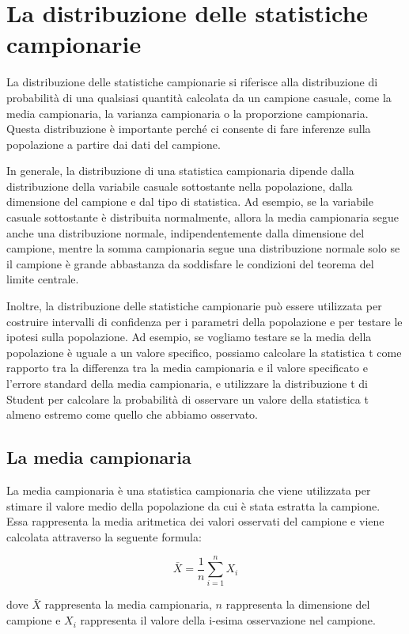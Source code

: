 \chapter{La distribuzione delle statistiche campionarie}
La distribuzione delle statistiche campionarie si riferisce alla distribuzione di probabilità di una qualsiasi quantità calcolata da un campione casuale, come la media campionaria, la varianza campionaria o la proporzione campionaria. Questa distribuzione è importante perché ci consente di fare inferenze sulla popolazione a partire dai dati del campione.

In generale, la distribuzione di una statistica campionaria dipende dalla distribuzione della variabile casuale sottostante nella popolazione, dalla dimensione del campione e dal tipo di statistica. Ad esempio, se la variabile casuale sottostante è distribuita normalmente, allora la media campionaria segue anche una distribuzione normale, indipendentemente dalla dimensione del campione, mentre la somma campionaria segue una distribuzione normale solo se il campione è grande abbastanza da soddisfare le condizioni del teorema del limite centrale.

Inoltre, la distribuzione delle statistiche campionarie può essere utilizzata per costruire intervalli di confidenza per i parametri della popolazione e per testare le ipotesi sulla popolazione. Ad esempio, se vogliamo testare se la media della popolazione è uguale a un valore specifico, possiamo calcolare la statistica t come rapporto tra la differenza tra la media campionaria e il valore specificato e l'errore standard della media campionaria, e utilizzare la distribuzione t di Student per calcolare la probabilità di osservare un valore della statistica t almeno estremo come quello che abbiamo osservato.

\section{La media campionaria}
La media campionaria è una statistica campionaria che viene utilizzata per stimare il valore medio della popolazione da cui è stata estratta la campione. Essa rappresenta la media aritmetica dei valori osservati del campione e viene calcolata attraverso la seguente formula:

$$\bar{X}=\frac{1}{n}\sum_{i=1}^n X_i$$

dove $\bar{X}$ rappresenta la media campionaria, $n$ rappresenta la dimensione del campione e $X_i$ rappresenta il valore della i-esima osservazione nel campione.

